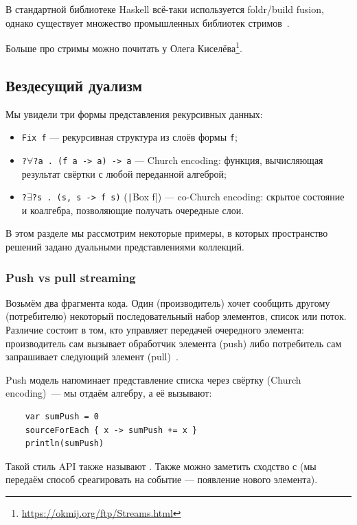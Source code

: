 В стандартной библиотеке Haskell всё-таки используется foldr/build fusion, однако существует множество промышленных библиотек стримов~\cite[глава 14]{bragilevsky-haskell}.

Больше про стримы можно почитать у Олега Киселёва\footnote{\url{https://okmij.org/ftp/Streams.html}}.

\subsection{Вездесущий дуализм} \label{subsec:data-duality}

Мы увидели три формы представления рекурсивных данных:
\begin{itemize}
    \item \texttt{Fix f} --- рекурсивная структура из слоёв формы \texttt{f};
    \item \texttt{?$\forall$?a . (f a -> a) -> a} --- Church encoding: функция, вычисляющая результат свёртки с любой переданной алгеброй;
    \item \texttt{?$\exists$?s . (s, s -> f s)} (\texttt|Box f|) --- co-Church encoding: скрытое состояние и коалгебра, позволяющие получать очередные слои.
\end{itemize}

В этом разделе мы рассмотрим некоторые примеры, в которых пространство решений задано дуальными представлениями коллекций.

\subsubsection{Push vs pull streaming} \label{subsubsec:push-pull}

Возьмём два фрагмента кода.
Один (производитель) хочет сообщить другому (потребителю) некоторый последовательный набор элементов, список или поток.
Различие состоит в том, кто управляет передачей очередного элемента: производитель сам вызывает обработчик элемента (push) либо потребитель сам запрашивает следующий элемент (pull)~\cite[параграф 3]{kiselyov2017stream}.

Push модель напоминает представление списка через свёртку (Church encoding)~--- мы отдаём алгебру, а её вызывают:
\begin{verbatim}
    var sumPush = 0
    sourceForEach { x -> sumPush += x }
    println(sumPush)
\end{verbatim}
Такой стиль API также называют .
Также можно заметить сходство с  (мы передаём способ среагировать на событие --- появление нового элемента).

